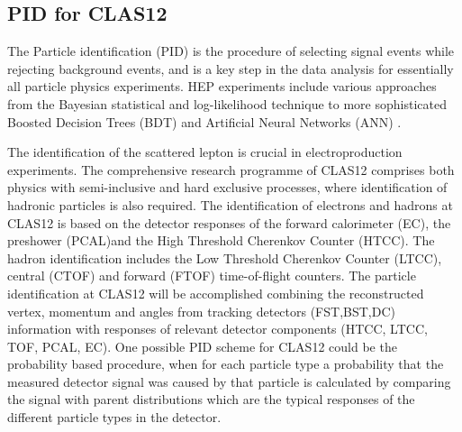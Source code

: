 \subsection{PID for CLAS12}
The Particle identification (PID) is the procedure of selecting signal events while
rejecting background events, and is a key step in the data analysis for essentially
all particle physics experiments.
HEP experiments include various approaches from the Bayesian statistical and 
log-likelihood technique \cite{BELLE,HERMES}
to more sophisticated Boosted Decision 
Trees (BDT) \cite{BDT} and Artificial Neural Networks (ANN) \cite{ANN}.

The identification  of the scattered lepton is crucial in electroproduction experiments.
The comprehensive research programme of CLAS12 comprises both physics with semi-inclusive and 
hard exclusive processes, where identification of hadronic particles is also required.
The identification of electrons and hadrons at CLAS12 is based on the detector responses 
of the forward calorimeter (EC), the preshower (PCAL)and the High Threshold 
Cherenkov Counter (HTCC). The hadron identification includes the Low Threshold Cherenkov
Counter (LTCC), central (CTOF) and forward (FTOF) time-of-flight counters.
The particle identification at CLAS12 will be accomplished combining 
the reconstructed vertex, momentum and angles from tracking detectors (FST,BST,DC)
information with responses of 
relevant detector components (HTCC, LTCC, TOF, PCAL, EC).
 One  possible PID scheme
for CLAS12 could be the probability based procedure, when for each particle type a probability
that the measured detector signal was caused by that particle is calculated
by comparing the signal with parent distributions which are the typical 
responses of the different particle types in the detector.

